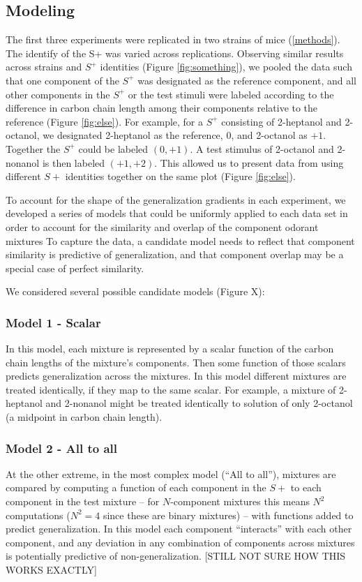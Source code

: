 \subsection{Modeling}

The first three experiments were replicated in two strains of mice (\ref{methods}). The identify of the S+ was varied across replications.  Observing similar results across strains and $S^+$ identities (Figure \ref{fig:something}), we pooled the data such that one component of the $S^+$ was designated as the reference component, and all other components in the $S^+$ or the test stimuli were labeled according to the difference in carbon chain length among their components relative to the reference (Figure \ref{fig:else}).  For example, for a $S^+$ consisting of 2-heptanol and 2-octanol, we designated 2-heptanol as the reference, $0$, and 2-octanol as $+1$.  Together the $S^+$ could be labeled $(0,+1)$.  A test stimulus of 2-octanol and 2-nonanol is then labeled $(+1,+2)$.  This allowed us to present data from using different $S+$ identities together on the same plot (Figure \ref{fig:else}).  

To account for the shape of the generalization gradients in each experiment, we developed a series of models that could be uniformly applied to each data set in order to account for  the similarity and overlap of the component odorant mixtures  To capture the data, a candidate model needs to reflect that component similarity is predictive of generalization, and that component overlap may be a special case of perfect similarity.  

We considered several possible candidate models (Figure X):

\subsubsection{Model 1 - Scalar}
In this model, each mixture is represented by a scalar function of the carbon chain lengths of the mixture’s components.  Then some function of those scalars predicts generalization across the mixtures.  In this model different mixtures are treated identically, if they map to the same scalar.  For example, a mixture of 2-heptanol and 2-nonanol might be treated identically to solution of only 2-octanol (a midpoint in carbon chain length).  

\subsubsection{Model 2 - All to all}
At the other extreme, in the most complex model (``All to all''), mixtures are compared by computing a function of each component in the $S+$ to each component in the test mixture -- for $N$-component mixtures this means $N^2$ computations ($N^2 = 4$ since these are binary mixtures) -- with functions added to predict generalization.  In this model each component ``interacts'' with each other component, and any deviation in any combination of components across mixtures is potentially predictive of non-generalization.  
[STILL NOT SURE HOW THIS WORKS EXACTLY]

